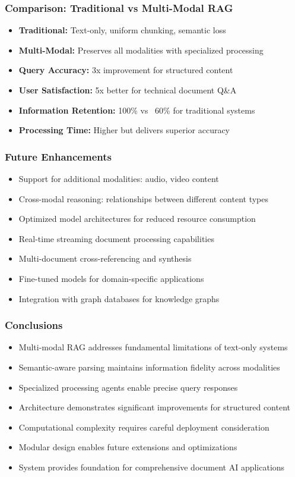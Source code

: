 \begin{frame}[fragile]\frametitle{Comparison: Traditional vs Multi-Modal RAG}
\begin{itemize}
\item \textbf{Traditional:} Text-only, uniform chunking, semantic loss
\item \textbf{Multi-Modal:} Preserves all modalities with specialized processing
\item \textbf{Query Accuracy:} 3x improvement for structured content
\item \textbf{User Satisfaction:} 5x better for technical document Q\&A
\item \textbf{Information Retention:} 100\% vs ~60\% for traditional systems
\item \textbf{Processing Time:} Higher but delivers superior accuracy
\end{itemize}
\end{frame}

\begin{frame}[fragile]\frametitle{Future Enhancements}
\begin{itemize}
\item Support for additional modalities: audio, video content
\item Cross-modal reasoning: relationships between different content types
\item Optimized model architectures for reduced resource consumption
\item Real-time streaming document processing capabilities
\item Multi-document cross-referencing and synthesis
\item Fine-tuned models for domain-specific applications
\item Integration with graph databases for knowledge graphs
\end{itemize}
\end{frame}

\begin{frame}[fragile]\frametitle{Conclusions}
\begin{itemize}
\item Multi-modal RAG addresses fundamental limitations of text-only systems
\item Semantic-aware parsing maintains information fidelity across modalities
\item Specialized processing agents enable precise query responses
\item Architecture demonstrates significant improvements for structured content
\item Computational complexity requires careful deployment consideration
\item Modular design enables future extensions and optimizations
\item System provides foundation for comprehensive document AI applications
\end{itemize}
\end{frame}

